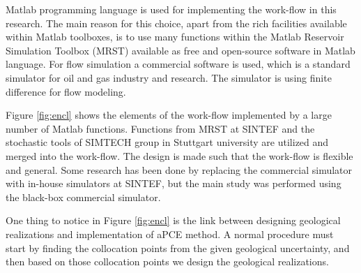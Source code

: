 Matlab programming language is used for implementing the work-flow in this
research. The main reason for this choice, apart from the rich facilities
available within Matlab toolboxes, is to use many functions within the 
Matlab Reservoir Simulation Toolbox (MRST) \cite{lie2011open,mrst} available as
free and
open-source software in Matlab language. For flow simulation a commercial
software is used, which is a standard simulator for oil and gas industry and
research. The simulator is using finite difference for flow modeling. 

Figure \ref{fig:encl} shows the elements of the work-flow implemented by a large
number of Matlab functions. Functions from MRST at SINTEF and the stochastic
tools of SIMTECH group in Stuttgart university are utilized and merged into the
work-flow. The design is made such that the work-flow is flexible and general.
Some research has been done by replacing the commercial simulator with in-house
simulators at SINTEF, but the main study was performed using the black-box
commercial simulator. 

One thing to notice in Figure  \ref{fig:encl} is the link between designing
geological realizations and implementation of aPCE method. A normal procedure
must start by finding the collocation points from the given geological
uncertainty, and then based on those collocation points we design the
geological realizations.
